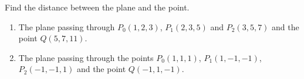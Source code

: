 Find the distance between the plane and the point.

\begin{enumerate}
\item The plane passing through $P_0(1,2,3) $, $P_1(2,3,5)$ and $P_2(3,5,7)$ and the point $Q(5,7,11)$.
\item The plane passing through the points $P_0(1,1,1)$, $P_1(1,-1,-1)$, $P_2(-1,-1,1)$ and the point $Q(-1,1,-1)$.
\end{enumerate}